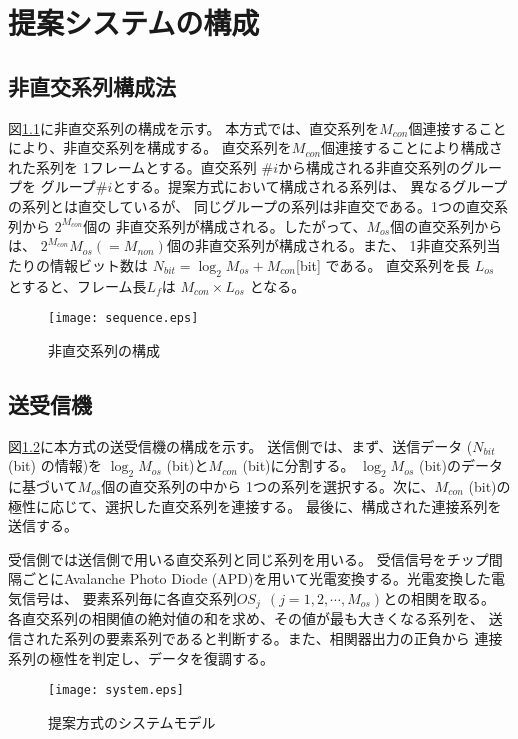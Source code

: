 ﻿\chapter{提案システムの構成}

\section{非直交系列構成法}
図\ref{fig:structure}に非直交系列の構成を示す。
本方式では、直交系列を$M_{con}$個連接することにより、非直交系列を構成する。
直交系列を$M_{con}$個連接することにより構成された系列を
1フレームとする。直交系列 \#$i$から構成される非直交系列のグループを
グループ\#$i$とする。提案方式において構成される系列は、
異なるグループの系列とは直交しているが、
同じグループの系列は非直交である。1つの直交系列から $2^{M_{con}}$個の
非直交系列が構成される。したがって、$M_{os}$個の直交系列からは、
$2^{M_{con}} M_{os}(=M_{non})$個の非直交系列が構成される。また、
1非直交系列当たりの情報ビット数は
$N_{bit} = \log_2 M_{os} + M_{con}$[bit] である。
直交系列を長 $L_{os}$ とすると、フレーム長$L_f$は $M_{con} \times L_{os}$ となる。
%
%
\begin{figure}[hpbt]
\begin{center}
  \texttt{[image: sequence.eps]}
\caption{非直交系列の構成}
\label{fig:structure}
\end{center}
\end{figure}
%

\section{送受信機}
図\ref{fig:model}に本方式の送受信機の構成を示す。
送信側では、まず、送信データ ($N_{bit}$(bit) の情報)を
$\log_2 M_{os}$ (bit)と$M_{con}$ (bit)に分割する。
$\log_2 M_{os}$ (bit)のデータに基づいて$M_{os}$個の直交系列の中から
1つの系列を選択する。次に、$M_{con}$ (bit)の極性に応じて、選択した直交系列を連接する。
最後に、構成された連接系列を送信する。
%

受信側では送信側で用いる直交系列と同じ系列を用いる。
受信信号をチップ間隔ごとにAvalanche Photo Diode (APD)を用いて光電変換する。光電変換した電気信号は、
要素系列毎に各直交系列$OS_{j}~~(j=1,2, \cdots, M_{os})$との相関を取る。
各直交系列の相関値の絶対値の和を求め、その値が最も大きくなる系列を、
送信された系列の要素系列であると判断する。また、相関器出力の正負から
連接系列の極性を判定し、データを復調する。
\begin{figure}[hpbt]
\begin{center}
  \texttt{[image: system.eps]}
\caption{提案方式のシステムモデル}
\label{fig:model}
\end{center}
\end{figure}
%
%

